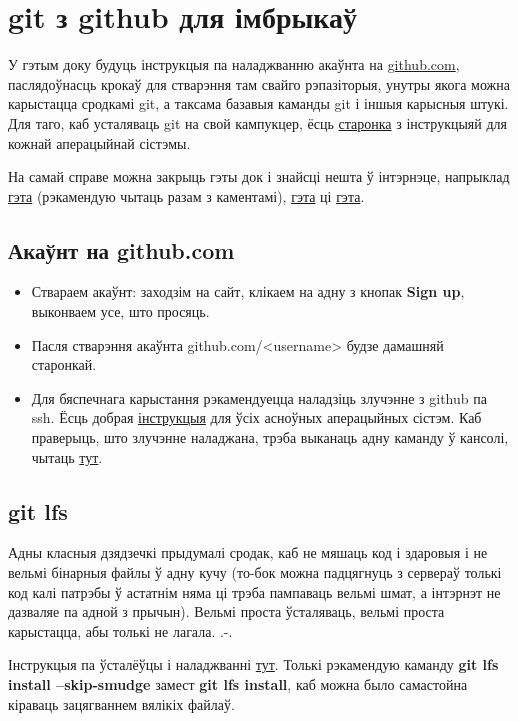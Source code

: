 \documentclass[12pt, a4paper]{extarticle}
\begin{document}
\section{git з github для імбрыкаў}

У гэтым доку будуць інструкцыя па наладжванню акаўнта на \href{https://github.com/}{github.com}, паслядоўнасць крокаў для стварэння там свайго рэпазіторыя, унутры якога можна карыстацца сродкамі git, а таксама базавыя каманды git і іншыя карысныя штукі. Для таго, каб усталяваць git на свой кампукцер, ёсць \href{https://git-scm.com/book/en/v2/Getting-Started-Installing-Git}{старонка} з інструкцыяй для кожнай аперацыйнай сістэмы.

На самай справе можна закрыць гэты док і знайсці нешта ў інтэрнэце, напрыклад \href{https://habr.com/ru/post/125799/}{гэта} (рэкамендую чытаць разам з каментамі), \href{https://www.tutorialspoint.com/git/index.htm}{гэта} ці \href{https://githowto.com}{гэта}.

\subsection{Акаўнт на github.com}

\begin{itemize}

\item Ствараем акаўнт: заходзім на сайт, клікаем на адну з кнопак \textbf{Sign up}, выконваем усе, што просяць.

\item Пасля стварэння акаўнта github.com/<username> будзе дамашняй старонкай.

\item Для бяспечнага карыстання рэкамендуецца наладзіць злучэнне з github па ssh. Ёсць добрая \href{https://help.github.com/en/articles/generating-a-new-ssh-key-and-adding-it-to-the-ssh-agent}{інструкцыя} для ўсіх асноўных аперацыйных сістэм. Каб праверыць, што злучэнне наладжана, трэба выканаць адну каманду ў кансолі, чытаць \href{https://help.github.com/en/articles/testing-your-ssh-connection}{тут}.

\end{itemize}

\subsection{git lfs}

Адны класныя дзядзечкі прыдумалі сродак, каб не мяшаць код і здаровыя і не вельмі бінарныя файлы ў адну кучу (то-бок можна падцягнуць з сервераў толькі код калі патрэбы ў астатнім няма ці трэба пампаваць вельмі шмат, а інтэрнэт не дазваляе па адной з прычын). Вельмі проста ўсталяваць, вельмі проста карыстацца, абы толькі не лагала. .-.

Інструкцыя па ўсталёўцы і наладжванні \href{https://github.com/git-lfs/git-lfs}{тут}. Толькі рэкамендую каманду \textbf{git lfs install --skip-smudge} замест \textbf{git lfs install}, каб можна было самастойна кіраваць зацягваннем вялікіх файлаў. 
\end{document}
